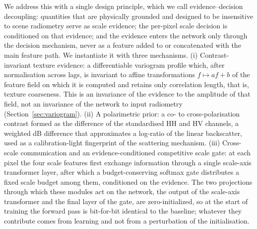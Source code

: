 \documentclass[preprint,12pt,authoryear]{elsarticle}
\begin{document}
We address this with a single design principle, which we call
evidence--decision decoupling: quantities that are physically grounded
and designed to be insensitive to scene radiometry serve as scale evidence; the
per-pixel scale decision is conditioned on that evidence; and the evidence
enters the network only through the decision mechanism, never as a feature
added to or concatenated with the main feature path. We instantiate it with
three mechanisms. (i)
Contrast-invariant texture evidence: a differentiable variogram profile
which, after normalisation across lags, is invariant to affine transformations
$f \mapsto af+b$ of the feature field on which it is computed and retains only
correlation length, that is, texture coarseness. This is an invariance of the
evidence to the amplitude of that field, not an invariance of the network to
input radiometry (Section~\ref{sec:variogram}). (ii) A polarimetric prior: a
co- to cross-polarisation contrast formed as the difference of the standardised
HH and HV channels, a weighted dB difference that approximates a log-ratio of
the linear backscatter, used as a calibration-light fingerprint of
the scattering mechanism. (iii) Cross-scale communication and an
evidence-conditioned competitive scale gate: at each pixel the four scale
features first exchange information through a single scale-axis transformer
layer, after which a budget-conserving softmax gate distributes a fixed scale
budget among them, conditioned on the evidence. The two projections through
which these modules act on the network, the output of the scale-axis
transformer and the final layer of the gate, are zero-initialized, so at the
start of training the forward pass is bit-for-bit identical to the baseline; whatever they contribute comes from learning and not
from a perturbation of the initialisation.
\end{document}
